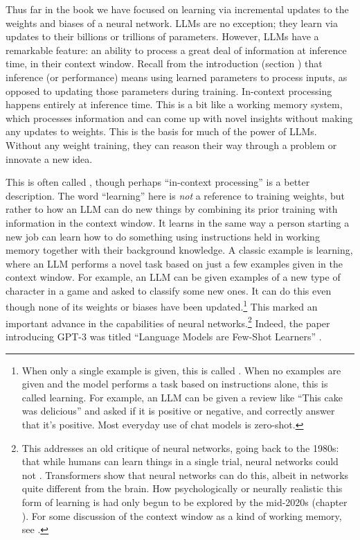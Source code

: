 Thus far in the book we have focused on learning via incremental updates to the
weights and biases of a neural network. LLMs are no exception; they learn via updates to their billions or trillions of
parameters. However, LLMs have a remarkable feature: an ability to process a great deal of information at inference time, in their context window. Recall from the introduction (section
) that inference (or performance) means using
learned parameters to process inputs, as opposed to updating those parameters
during training. In-context processing happens entirely at inference time. This is a bit like a working memory system, which processes information and can come up with novel insights without making any updates to weights. This is the basis for much of the power of LLMs. Without any weight training, they can reason their way through a problem or innovate a new idea.

This is often called , though perhaps
``in-context processing'' is a better description. The word ``learning'' here
is \emph{not} a reference to training weights, but rather to how an LLM can do
new things by combining its prior training with information in the context
window. It learns in the same way a person starting a new job can learn how to
do something using instructions held in working memory together with their
background knowledge. A classic example is  learning, where
an LLM performs a novel task based on just a few examples given in the context
window. For example, an LLM can be given examples of a new type of character in
a game and asked to classify some new ones. It can do this even though none of
its weights or biases have been updated.\footnote{When only a single example is
given, this is called . When no examples are given
and the model performs a task based on instructions alone, this is called
 learning. For example, an LLM can be given a review like
``This cake was delicious'' and asked if it is positive or negative, and
correctly answer that it's positive. Most everyday use of chat models is
zero-shot.} This marked an important advance in the
capabilities of neural networks.\footnote{This addresses an old critique of neural
networks, going back to the 1980s: that while humans can learn things in a
single trial, neural networks could not \cite{schneider1988structure}.
Transformers show that neural networks can do this, albeit in networks quite
different from the brain. How psychologically or neurally realistic this form
of learning is had only begun to be explored by the mid-2020s (chapter
). For some discussion of the context window as a kind of
working memory, see \cite{yoshimi2026phenomenology}.} Indeed, the paper introducing
GPT-3 was titled ``Language Models are Few-Shot Learners'' \cite{brown2020language}.


